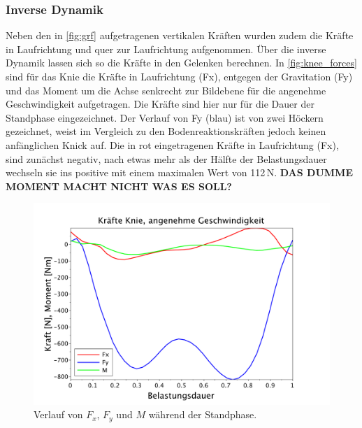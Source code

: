 \subsubsection{Inverse Dynamik}
Neben den in \autoref{fig:grf} aufgetragenen vertikalen Kräften wurden zudem die Kräfte in Laufrichtung und quer zur Laufrichtung aufgenommen. Über die inverse Dynamik lassen sich so die Kräfte in den Gelenken berechnen.
In \autoref{fig:knee_forces} sind für das Knie die Kräfte in Laufrichtung (Fx), entgegen der Gravitation (Fy) und das Moment um die Achse senkrecht zur Bildebene für die angenehme Geschwindigkeit aufgetragen. Die Kräfte sind hier nur für die Dauer der Standphase eingezeichnet. Der Verlauf von Fy (blau) ist von zwei Höckern gezeichnet, weist im Vergleich zu den Bodenreaktionskräften jedoch keinen anfänglichen Knick auf. Die in rot eingetragenen Kräfte in Laufrichtung (Fx), sind zunächst negativ, nach etwas mehr als der Hälfte der Belastungsdauer wechseln sie ins positive mit einem maximalen Wert von 112\,N. 
\textbf{DAS DUMME MOMENT MACHT NICHT WAS ES SOLL?}
\begin{figure}[h!]
	\centering
	\includegraphics[width=0.7\linewidth]{bilder/ergebnisse/forces_knee.pdf}
	\caption[Bodenreaktionskräfte]{Verlauf von $F_x$, $F_y$ und $M$ während der Standphase.}
	\label{fig:knee_forces}
\end{figure}


